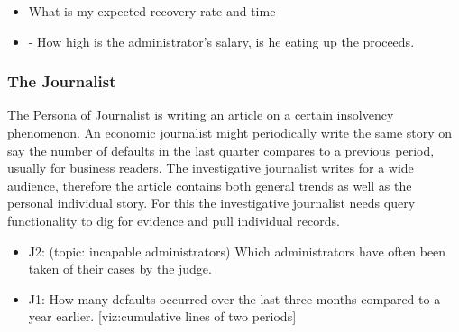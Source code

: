 \begin{itemize}
	\item What is my expected recovery rate and time
	\item -	How high is the administrator’s salary, is he eating up the proceeds.
\end{itemize}

\subsubsection{The Journalist}
The Persona of Journalist is writing an article on a certain insolvency phenomenon. An economic journalist might periodically write the same story on say the number of defaults in the last quarter compares to a previous period, usually for business readers. The investigative journalist writes for a wide audience, therefore the article contains both general trends as well as the personal individual story. For this the investigative journalist needs query functionality to dig for evidence and pull individual records.

\begin{itemize}
	\item J2: (topic: incapable administrators) Which administrators have often been taken of their cases by the judge.
	\item J1: How many defaults occurred over the last three months compared to a year earlier. [viz:cumulative lines of two periods]
\end{itemize}
